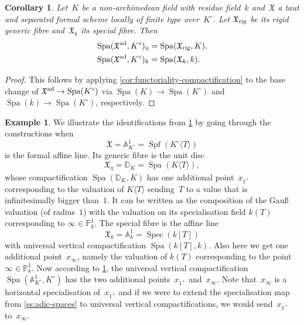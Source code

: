 \documentclass[a4paper,twoside,11pt,reqno]{amsart}
\renewcommand{\mathbb}{\mathds}
\newcommand{\bA}{{\mathbb A}}
\newcommand{\bP}{{\mathbb P}}
\newcommand{\bD}{{\mathbb D}}
\newcommand{\fX}{{\mathfrak{X}}}
\DeclareMathOperator{\Spec}{Spec}
\DeclareMathOperator{\Spf}{Spf}
\DeclareMathOperator{\Spa}{Spa}
\newcommand{\rig}{{\rm rig}}
\newtheorem{cor}[thm]{Corollary}
\theoremstyle{definition}
\newtheorem{ex}[thm]{Example}
\numberwithin{equation}{subsection}
\begin{document}
\begin{cor} \label{cor:base-change-comp}
    Let~$K$ be a non-archimedean field with residue field~$k$ and~$\fX$ a taut and separated formal scheme locally of finite type over~$K^\circ$.
    Let $\fX_\rig$ be its rigid generic fibre and~$\fX_k$ its special fibre.
    Then
    \begin{align*}
     \Spa(\fX^{\rm ad},K^\circ)_\eta &= \Spa(\fX_\rig,K),   \\
     \Spa(\fX^{\rm ad},K^\circ)_k &= \Spa(\fX_k,k).
    \end{align*}
\end{cor}

\begin{proof}
    This follows by applying \cref{cor:functoriality-compactification} to the base change of $\fX^{\rm ad} \to \Spa(K^\circ)$ via $\Spa(K) \to \Spa(K^\circ)$ and $\Spa(k) \to \Spa(K^\circ)$, respectively.
\end{proof}

\begin{ex} \label{ex:comp-disk}
    We illustrate the identifications from  \cref{cor:base-change-comp} by going through the constructions when
    \[
        \fX = \bA^1_{K^\circ} =  \Spf (K^\circ \langle T \rangle)
    \]
    is the formal affine line.
    Its generic fibre is the unit disc
    \[
        \fX_\eta = \bD_K = \Spa (K \langle T \rangle),
    \]
    whose compactification $\Spa(\bD_K,K)$ has one additional point~$x_{1^+}$ corresponding to the valuation of $K \langle T \rangle$ sending~$T$ to a value that is infinitesimally bigger than~$1$.
    It can be written as the composition of the Gauß valuation (of radius~$1$) with the valuation on its specialisation field $k(T)$ corresponding to $\infty \in \bP^1_k$.
    The special fibre is the affine line
    \[
        \fX_k = \bA^1_k = \Spec (k[T])
    \]
    with universal vertical compactification $\Spa(k[T],k)$.
    Also here we get one additional point~$x_{\infty}$, namely the valuation of $k(T)$ corresponding to the point $\infty \in \bP^1_k$.
    Now according to \cref{cor:base-change-comp}, the universal vertical compactification $\Spa(\bA^1_{K^\circ},K^\circ)$ has the two additional points~$x_{1^+}$ and~$x_\infty$.
    Note that~$x_\infty$ is a horizontal specialisation of~$x_{1^+}$ and if we were to extend the specialisation map from \cref{ss:adic-spaces} to universal vertical compactifications, we would send~$x_{1^+}$ to~$x_\infty$.
\end{ex}
\end{document}
